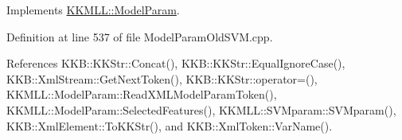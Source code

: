 Implements \hyperlink{class_k_k_m_l_l_1_1_model_param_a671c3ef465614d548e3730ca0427eb67}{K\+K\+M\+L\+L\+::\+Model\+Param}.



Definition at line 537 of file Model\+Param\+Old\+S\+V\+M.\+cpp.



References K\+K\+B\+::\+K\+K\+Str\+::\+Concat(), K\+K\+B\+::\+K\+K\+Str\+::\+Equal\+Ignore\+Case(), K\+K\+B\+::\+Xml\+Stream\+::\+Get\+Next\+Token(), K\+K\+B\+::\+K\+K\+Str\+::operator=(), K\+K\+M\+L\+L\+::\+Model\+Param\+::\+Read\+X\+M\+L\+Model\+Param\+Token(), K\+K\+M\+L\+L\+::\+Model\+Param\+::\+Selected\+Features(), K\+K\+M\+L\+L\+::\+S\+V\+Mparam\+::\+S\+V\+Mparam(), K\+K\+B\+::\+Xml\+Element\+::\+To\+K\+K\+Str(), and K\+K\+B\+::\+Xml\+Token\+::\+Var\+Name().


